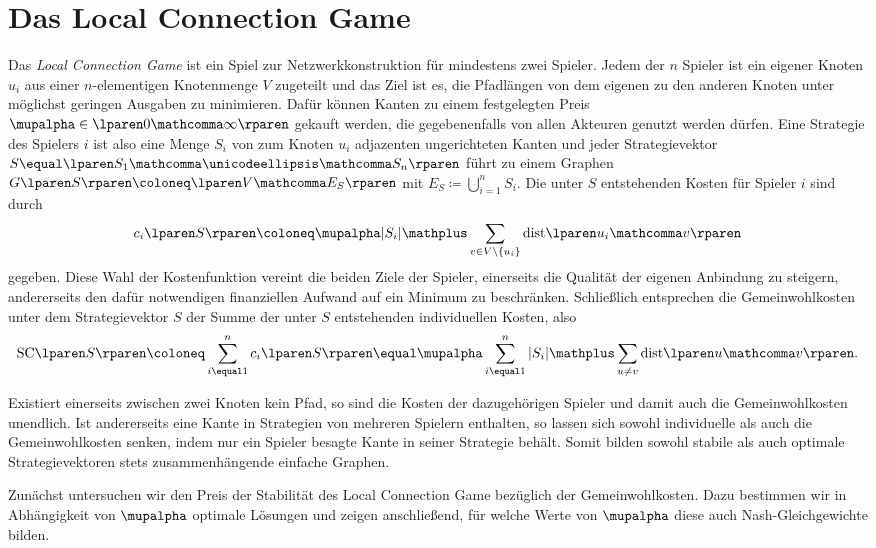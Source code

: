 \section{Das Local Connection Game}
\label{sec:local}

Das \emph{Local Connection Game} ist ein Spiel zur Netzwerkkonstruktion
für mindestens zwei Spieler.
Jedem der $n$ Spieler ist ein eigener Knoten $u_i$
aus einer $n$-elementigen Knotenmenge $V$ zugeteilt
und das Ziel ist es,
die Pfadlängen von dem eigenen zu den anderen Knoten
unter möglichst geringen Ausgaben zu minimieren.
Dafür können Kanten zu einem festgelegten Preis
$\mupalpha \in \lparen 0 \mathcomma \infty \rparen$
gekauft werden,
die gegebenenfalls von allen Akteuren genutzt werden dürfen.
Eine Strategie des Spielers $i$ ist also
eine Menge $S_i$ von zum Knoten $u_i$ adjazenten ungerichteten Kanten
und jeder Strategievektor
$S \equal \lparen S_1 \mathcomma \unicodeellipsis \mathcomma S_n \rparen$
führt zu einem Graphen
$G \lparen S \rparen \coloneq \lparen V \mathcomma E_S \rparen$
mit $E_S \coloneq \bigcup_{ i\equal 1 }^n S_i$.
Die unter $S$ entstehenden Kosten für Spieler $i$ sind durch
\[
  c_i \lparen S \rparen
  \coloneq
  \mupalpha \vert S_i \vert
  \mathplus \sum_{ v \in V \setminus \lbrace u_i \rbrace } \dist{u_i}{v}
\]
gegeben.
Diese Wahl der Kostenfunktion vereint die beiden Ziele der Spieler,
einerseits die Qualität der eigenen Anbindung zu steigern,
andererseits den dafür notwendigen finanziellen Aufwand
auf ein Minimum zu beschränken.
Schließlich entsprechen die Gemeinwohlkosten unter dem Strategievektor $S$
der Summe der unter $S$ entstehenden individuellen Kosten,
also
\[
  \SC{S}
  \coloneq
  \sum_{ i \equal 1 }^n c_i \lparen S \rparen
  \equal
  \mupalpha \sum_{ i \equal 1 }^n \vert S_i \vert
  \mathplus \sum_{ u \ne v } \dist{u}{v}.
\]

Existiert einerseits zwischen zwei Knoten kein Pfad,
so sind die Kosten der dazugehörigen Spieler
und damit auch die Gemeinwohlkosten unendlich.
Ist andererseits eine Kante in Strategien von mehreren Spielern enthalten,
so lassen sich sowohl individuelle als auch die Gemeinwohlkosten senken,
indem nur ein Spieler besagte Kante in seiner Strategie behält.
Somit bilden sowohl stabile als auch optimale Strategievektoren
stets zusammenhängende einfache Graphen.

\bigskip

Zunächst untersuchen wir den Preis der Stabilität des Local Connection Game
bezüglich der Gemeinwohlkosten.
Dazu bestimmen wir in Abhängigkeit von $\mupalpha$
optimale Lösungen und zeigen anschließend,
für welche Werte von $\mupalpha$ diese auch Nash-Gleichgewichte bilden.

